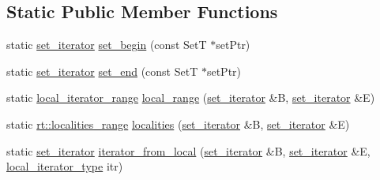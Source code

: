 \subsection*{Static Public Member Functions}
\begin{DoxyCompactItemize}
\item 
static \hyperlink{classshad_1_1set__iterator}{set\-\_\-iterator} \hyperlink{classshad_1_1set__iterator_a9dc1174f6bba2f83943450e0edcefdab}{set\-\_\-begin} (const Set\-T $\ast$set\-Ptr)
\item 
static \hyperlink{classshad_1_1set__iterator}{set\-\_\-iterator} \hyperlink{classshad_1_1set__iterator_a8985de6f91372745fd2a4686b6cdc2a9}{set\-\_\-end} (const Set\-T $\ast$set\-Ptr)
\item 
static \hyperlink{classshad_1_1set__iterator_1_1local__iterator__range}{local\-\_\-iterator\-\_\-range} \hyperlink{classshad_1_1set__iterator_a366136100eb4de6676eab9918c128483}{local\-\_\-range} (\hyperlink{classshad_1_1set__iterator}{set\-\_\-iterator} \&B, \hyperlink{classshad_1_1set__iterator}{set\-\_\-iterator} \&E)
\item 
static \hyperlink{classshad_1_1rt_1_1localities__range}{rt\-::localities\-\_\-range} \hyperlink{classshad_1_1set__iterator_a05e3dc79288b4f9dd03f9289612b22db}{localities} (\hyperlink{classshad_1_1set__iterator}{set\-\_\-iterator} \&B, \hyperlink{classshad_1_1set__iterator}{set\-\_\-iterator} \&E)
\item 
static \hyperlink{classshad_1_1set__iterator}{set\-\_\-iterator} \hyperlink{classshad_1_1set__iterator_a8c432b84360eae7b83eef48f8e96f417}{iterator\-\_\-from\-\_\-local} (\hyperlink{classshad_1_1set__iterator}{set\-\_\-iterator} \&B, \hyperlink{classshad_1_1set__iterator}{set\-\_\-iterator} \&E, \hyperlink{classshad_1_1set__iterator_a162b1b9d8dfe2e3a656fcdacf0450939}{local\-\_\-iterator\-\_\-type} itr)
\end{DoxyCompactItemize}


